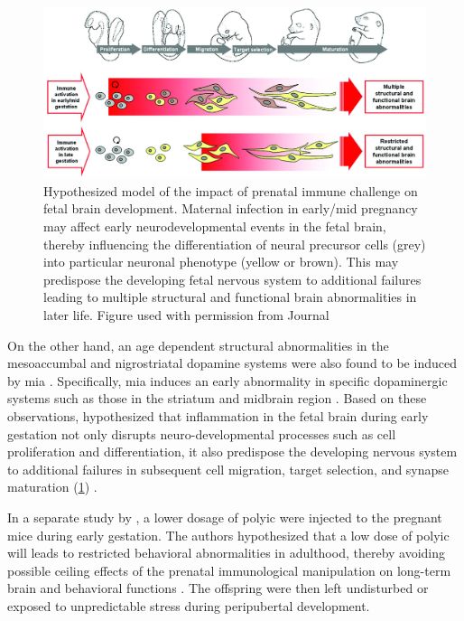 \documentclass[12pt]{scrbook}
\begin{document}
\begin{figure}
	\centering
	\includegraphics[width=\textwidth]{figure/mia_impact.jpg}
	\caption[Hypothesized model of the impact of prenatal immune challenge on fetal brain development]{Hypothesized model of the impact of prenatal immune challenge on fetal brain development.
		Maternal infection in early/mid pregnancy may affect early neurodevelopmental events in the fetal brain, thereby influencing the differentiation of neural precursor cells (grey) into particular neuronal phenotype (yellow or brown).
		This may predispose the developing fetal nervous system to additional failures leading to multiple structural and functional brain abnormalities in later life.
		Figure used with permission from Journal \citep{Meyer2007a}}
	\label{fig:miaEffect}
\end{figure}

On the other hand, an age dependent structural abnormalities in the mesoaccumbal and nigrostriatal dopamine systems were also found to be induced by \gls{mia} \citep{Vuillermot2010}.
Specifically, \gls{mia} induces an early abnormality in specific dopaminergic systems such as those in the striatum and midbrain region \citep{Vuillermot2010}.
Based on these observations, \citet{Meyer2007a} hypothesized that inflammation in the fetal brain during early gestation not only disrupts neuro-developmental processes such as cell proliferation and differentiation, it also predispose the developing nervous system to additional failures in subsequent cell migration, target selection, and synapse maturation (\cref{fig:miaEffect}) \citep{Meyer2007a}.
	
In a separate study by \citet{Giovanoli2013}, a lower dosage of \gls{polyic} were injected to the pregnant mice during early gestation.
The authors hypothesized that a low dose of \gls{polyic} will leads to restricted behavioral abnormalities in adulthood, thereby avoiding possible ceiling effects of the prenatal immunological manipulation on long-term brain and behavioral functions \citep{Giovanoli2013}. 
The offspring were then left undisturbed or exposed to unpredictable stress during peripubertal development.
\end{document}
